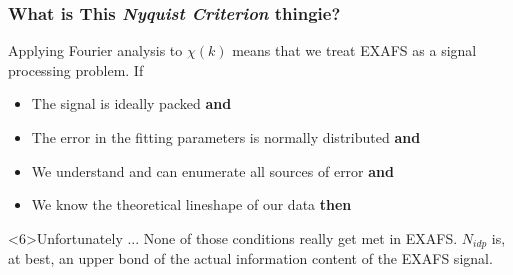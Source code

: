 \documentclass[10pt, xcolor=x11names, compress]{beamer}
\begin{document}
\begin{frame}
  \frametitle{What is This \textit{Nyquist Criterion} thingie?}

  Applying Fourier analysis to $\chi(k)$ means that we treat EXAFS as
  a signal processing problem.  If
  \begin{itemize}
  \item<1-> The signal is ideally packed \alert{\textbf{and}}
  \item<2-> The error in the fitting parameters is normally distributed
    \alert{\textbf{and}}
  \item<3-> We understand and can enumerate all sources of error
    \alert{\textbf{and}}
  \item<4-> We know the theoretical lineshape of our data
    \alert{\textbf{then}}
  \end{itemize}

  \medskip


  \begin{alertblock}<6>{Unfortunately ...}
    None of those conditions really get met in EXAFS.  $N_{idp}$ is,
    at best, an upper bond of the actual information content of the
    EXAFS signal.
  \end{alertblock}
  
\end{frame}
\end{document}
